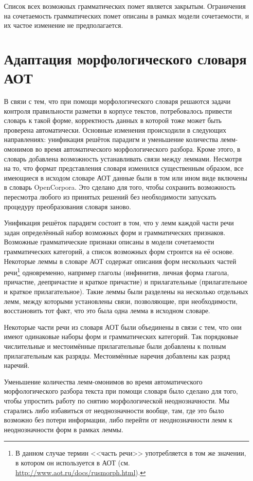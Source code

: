 \documentclass[a4paper]{article}
\begin{document}
Список всех возможных грамматических помет является закрытым. Ограничения на сочетаемость грамматических помет описаны в рамках модели сочетаемости, и их частое изменение не предполагается.
\section{Адаптация морфологического словаря АОТ}
В связи с тем, что при помощи морфологического словаря решаются задачи контроля правильности разметки в корпусе текстов, потребовалось привести словарь к такой форме, корректность данных в которой тоже может быть проверена автоматически. Основные изменения происходили в следующих направлениях: унификация решёток парадигм и уменьшение количества лемм-омонимов во время автоматического морфологического разбора. Кроме этого, в словарь добавлена возможность устанавливать связи между леммами. Несмотря на то, что формат представления словаря изменился существенным образом, все имеющиеся в исходом словаре АОТ данные были в том или ином виде включены в словарь OpenCorpora. Это сделано для того, чтобы сохранить возможность пересмотра любого из принятых решений без необходимости запускать процедуру преобразования словаря заново.

Унификация решёток парадигм состоит в том, что у лемм каждой части речи задан определённый набор возможных форм и грамматических признаков. Возможные грамматические признаки описаны в модели сочетаемости грамматических категорий, а список возможных форм строится на её основе. Некоторые леммы в словаре АОТ содержат описания форм нескольких частей речи\footnote{В данном случае термин <<часть речи>> употребляется в том же значении, в котором он используется в АОТ (см. \url{http://www.aot.ru/docs/rusmorph.html}).} одновременно, например глаголы (инфинитив, личная форма глагола, причастие, деепричастие и краткое причастие) и прилагательные (прилагательное и краткое прилагательное). Такие леммы были разделены на несколько отдельных лемм, между которыми установлены связи, позволяющие, при необходимости, восстановить тот факт, что это была одна лемма в исходном словаре.

Некоторые части речи из словаря АОТ были объединены в связи с тем, что они имеют одинаковые наборы форм и грамматических категорий. Так порядковые числительные и местоимённые прилагательные были добавлены к полным прилагательным как разряды. Местоимённые наречия добавлены как разряд наречий.

Уменьшение количества лемм-омонимов во время автоматического морфологического разбора текста при помощи словаря было сделано для того, чтобы упростить работу по снятию морфологической неоднозначности. Мы старались либо избавиться от неоднозначности вообще, там, где это было возможно без потери информации, либо перейти от неоднозначности лемм к неоднозначности форм в рамках леммы.
\end{document}
